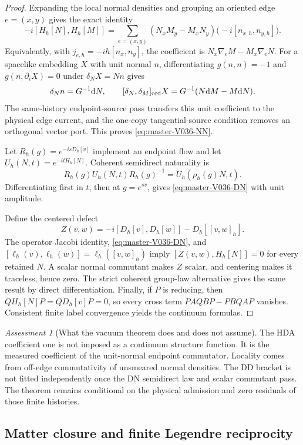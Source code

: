 \documentclass[11pt]{article}
\theoremstyle{definition}
\theoremstyle{remark}
\newtheorem{assessment}[theorem]{Assessment}
\newcommand{\dd}{\mathrm d}
\begin{document}
\begin{proof}
Expanding the local normal densities and grouping an oriented edge
\(e=(x,y)\) gives the exact identity
\[
 -i[H_h[N],H_h[M]]
 =\sum_{e=(x,y)}(N_xM_y-M_xN_y)
   \bigl(-i[n_{x,h},n_{y,h}]\bigr).
\]
Equivalently, with \(j_{e,h}=-ih[n_x,n_y]\), the coefficient is
\(N_x\nabla_eM-M_x\nabla_eN\).  For a spacelike embedding \(X\) with unit
normal \(n\), differentiating \(g(n,n)=-1\) and \(g(n,\partial_iX)=0\) under
\(\delta_NX=Nn\) gives
\[
 \delta_Nn=G^{-1}\dd N,
 \qquad
 [\delta_N,\delta_M]_{\rm ord}X
 =G^{-1}(N\dd M-M\dd N).
\]
The same-history endpoint-source pass transfers this unit coefficient to the
physical edge current, and the one-copy tangential-source condition removes an
orthogonal vector port.  This proves \eqref{eq:master-V036-NN}.

Let \(R_h(g)=e^{-isD_h[v]}\) implement an endpoint flow and let
\(U_h(N,t)=e^{-itH_h[N]}\).  Coherent semidirect naturality is
\[
 R_h(g)U_h(N,t)R_h(g)^{-1}=U_h(\rho_h(g)N,t).
\]
Differentiating first in \(t\), then at \(g=e^{sv}\), gives
\eqref{eq:master-V036-DN} with unit amplitude.

Define the centered defect
\[
 Z(v,w)=-i[D_h[v],D_h[w]]-D_h[[v,w]_h].
\]
The operator Jacobi identity, \eqref{eq:master-V036-DN}, and
\([\ell_h(v),\ell_h(w)]=\ell_h([v,w]_h)\) imply
\([Z(v,w),H_h[N]]=0\) for every retained \(N\).  A scalar normal commutant
makes \(Z\) scalar, and centering makes it traceless, hence zero.  The strict
coherent group-law alternative gives the same result by direct
differentiation.  Finally, if \(P\) is reducing, then
\(QH_h[N]P=QD_h[v]P=0\), so every cross term
\(PAQBP-PBQAP\) vanishes.  Consistent finite label convergence yields the
continuum formulas.
\end{proof}

\begin{assessment}[What the vacuum theorem does and does not assume]
The HDA coefficient one is not imposed as a continuum structure function.  It
is the measured coefficient of the unit-normal endpoint commutator.  Locality
comes from off-edge commutativity of unsmeared normal densities.  The DD
bracket is not fitted independently once the DN semidirect law and scalar
commutant pass.  The theorem remains conditional on the physical admission and
zero residuals of those finite histories.
\end{assessment}

\subsection{Matter closure and finite Legendre reciprocity}
\end{document}
